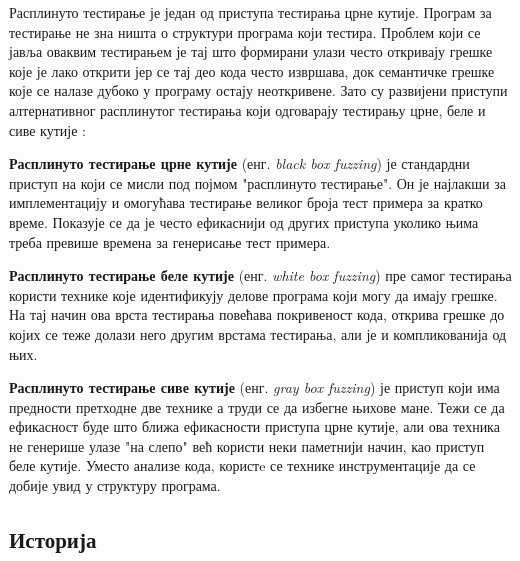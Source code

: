 \documentclass[12pt,oneside]{memoir}
\begin{document}
Расплинуто тестирање је један од приступа тестирања црне кутије. Програм за тестирање не зна ништа о структури програма који тестира. Проблем који се јавља оваквим тестирањем је тај што формирани улази често откривају грешке које је лако открити јер се тај део кода често извршава,  док семантичке грешке које се налазе дубоко у програму остају неоткривене. Зато су развијени приступи алтернативног расплинутог тестирања који одговарају тестирању црне, беле и сиве кутије \cite{fuzzing, grayBoxFuzzing, whiteBoxFuzzing}:
\begin{description}
\item\textbf{Расплинуто тестирање црне кутије} (енг. \textit{black box fuzzing}) је стандардни приступ на који се мисли под појмом "расплинуто тестирање". Он је најлакши за имплементацију и омогућава тестирање великог броја тест примера за кратко време. Показује се да је често ефикаснији од других приступа уколико њима треба превише времена за генерисање тест примера.
\item\textbf{Расплинуто тестирање беле кутије} (енг. \textit{white box fuzzing}) пре самог тестирања користи технике које идентификују делове програма који могу да имају грешке. На тај начин ова врста тестирања повећава покривеност кода, открива грешке до којих се теже долази него другим врстама тестирања, али је и компликованија од њих. 
\item\textbf{Расплинуто тестирање сиве кутије} (енг. \textit{gray box fuzzing}) је приступ који има предности претходне две технике а труди се да избегне њихове мане. Тежи се да ефикасност буде што ближа ефикасности приступа црне кутије, али ова техника не генерише улазе "на слепо" већ користи неки паметнији начин, као приступ беле кутије. Уместо анализе кода, користe се технике инструментације да се добије увид у структуру програма.
\end{description}

\subsection{Историја}
\label{subsec:history}
\end{document}
